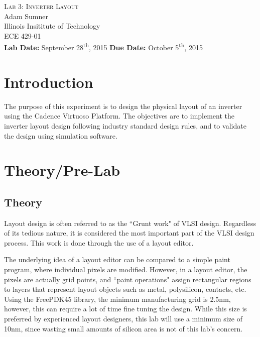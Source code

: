 \documentclass[12pt]{article}
\begin{document}
\begin{titlepage}
	\begin{center}
		
		
		\vfill
		
		\textsc{\LARGE Lab 3: Inverter Layout}\\[1.5cm]
		
		\Large Adam Sumner\\[0.5cm]
		
		\Large Illinois Insititute of Technology\\[0.5cm]
		
		\Large ECE 429-01\\[0.5cm]	
		
		\noindent
		\vfill
		\large \textbf{Lab Date:} September 28\textsuperscript{th}, 2015\hfill
		\large \textbf{Due Date:} October 5\textsuperscript{th}, 2015
	
		
	\end{center}
\end{titlepage}

\section{Introduction}
The purpose of this experiment is to design the physical layout of an inverter using the Cadence Virtuoso Platform. The objectives are to implement the inverter layout design following industry standard design rules, and to validate the design using simulation software.
\section{Theory/Pre-Lab}
\subsection{Theory}
Layout design is often referred to as the ``Grunt work" of VLSI design. Regardless of its tedious nature, it is considered the most important part of the VLSI design process. This work is done through the use of a layout editor.

The underlying idea of a layout editor can be compared to a simple paint program, where individual pixels are modified. However, in a layout editor, the pixels are actually grid points, and ``paint operations" assign rectangular regions to layers that represent layout objects such as metal, polysilicon, contacts, etc. Using the FreePDK45 library, the minimum manufacturing grid is 2.5nm, however, this can require a lot of time fine tuning the design. While this size is preferred by experienced layout designers, this lab will use a minimum size of 10nm, since wasting small amounts of silicon area is not of this lab's concern. 
\end{document}
